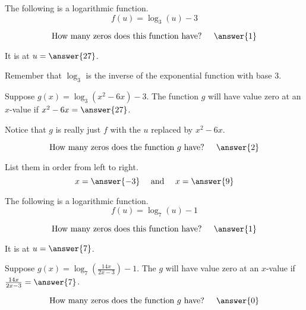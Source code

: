 \documentclass{ximera}
\author{Bobby Ramsey}
\begin{document}
\begin{exercise}
	The following is a logarithmic function.
	$$f(u) = \log_3(u) - 3$$
	
	$$ \text{How many zeros does this function have? } \quad \answer{1} $$
	
	\begin{exercise}
		It is at $u = \answer{27}$.
		\begin{hint}
			Remember that $\log_3$ is the inverse of the exponential function with base $3$.
		\end{hint}
		\begin{exercise}
			Suppose $g(x) = \log_3(x^2-6x)-3$. The function $g$ will have value zero at an $x$-value if $x^2-6x=\answer{27}$.
			\begin{hint}
				Notice that $g$ is really just $f$ with the $u$ replaced  by $x^2-6x$.
			\end{hint}		
			\begin{exercise}
				$$ \text{How many zeros does the function } g \text{ have? } \quad \answer{2} $$
				\begin{exercise}
					List them in order from left to right.
					\[ x = \answer{-3}  \quad \text{ and } \quad x=\answer{9} \]
				\end{exercise}						
			\end{exercise}
		\end{exercise}
	\end{exercise}
\end{exercise}




\begin{exercise}
	The following is a logarithmic function.
	$$f(u) = \log_7(u) - 1$$
	
	$$ \text{How many zeros does this function have? } \quad \answer{1} $$
	
	\begin{exercise}
		It is at $u = \answer{7}$.

		\begin{exercise}
			Suppose $g(x) = \log_7\left( \frac{14x}{2x-3} \right)-1$. The $g$ will have value zero at an $x$-value if $\frac{14x}{2x-3}=\answer{7}$.
			\begin{exercise}
				$$ \text{How many zeros does the function } g \text{ have? } \quad \answer{0} $$
			\end{exercise}
		\end{exercise}
	\end{exercise}
\end{exercise}
\end{document}
